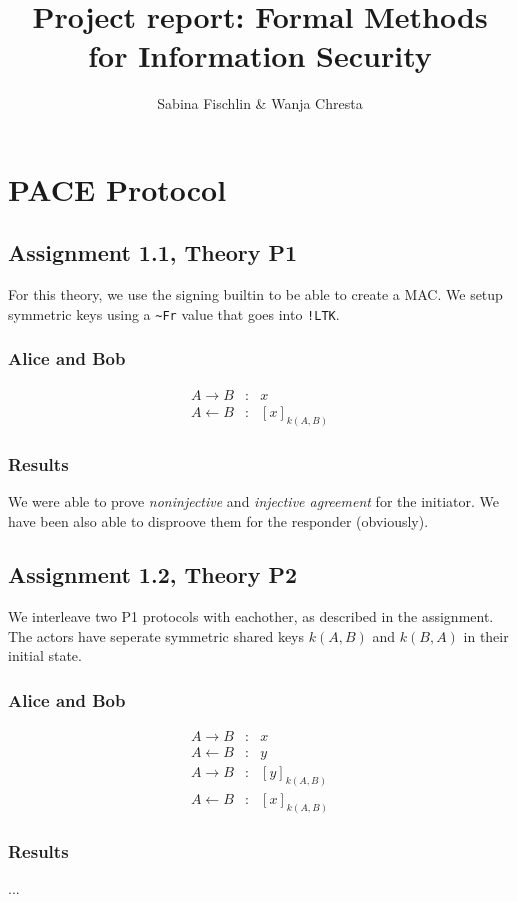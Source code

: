 \documentclass[a4paper]{article}
\title{Project report: Formal Methods for Information Security}
\author{Sabina Fischlin \& Wanja Chresta}
\begin{document}
\maketitle

\newcommand{\Fr}{\texttt{\textasciitilde{}Fr}}
\newcommand{\LTK}{\texttt{!LTK}}

\section{PACE Protocol}
\subsection{Assignment 1.1, Theory P1}
For this theory, we use the signing builtin to be able to create a MAC. We setup symmetric keys using a \Fr{} value that goes into \LTK .
\subsubsection{Alice and Bob}
\begin{eqnarray*}
A \to B        & : & x\\
A \leftarrow B & : & [x]_{k(A,B)}
\end{eqnarray*}
\subsubsection{Results}
We were able to prove {\em noninjective} and {\em injective agreement} for the initiator. We have been also able to disproove them for the responder (obviously).

\subsection{Assignment 1.2, Theory P2}
We interleave two P1 protocols with eachother, as described in the assignment. The actors have seperate symmetric shared keys $k(A,B)$ and $k(B,A)$ in their initial state.
\subsubsection{Alice and Bob}
\begin{eqnarray*}
A \to B        & : & x\\
A \leftarrow B & : & y\\
A \to B        & : & [y]_{k(A,B)}\\
A \leftarrow B & : & [x]_{k(A,B)} 
\end{eqnarray*}
\subsubsection{Results}
...
\end{document}
